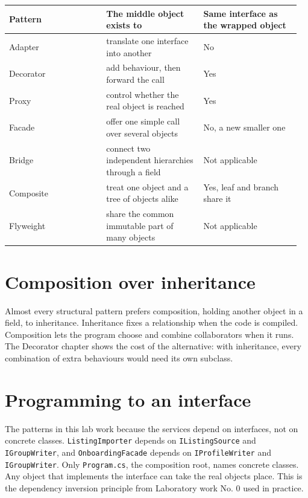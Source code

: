 \documentclass{utmreport}
\providecommand{\passthrough}[1]{#1}
\newcounter{none}
\begin{document}
{\def\LTcaptype{none} %
\begin{longtable}[]{@{}>{\raggedright\arraybackslash}p{0.320\linewidth}>{\raggedright\arraybackslash}p{0.320\linewidth}>{\raggedright\arraybackslash}p{0.320\linewidth}@{}}
\toprule\noalign{}
Pattern & The middle object exists to & Same interface as the wrapped object \\
\midrule\noalign{}
\endhead
\bottomrule\noalign{}
\endlastfoot
Adapter & translate one interface into another & No \\
Decorator & add behaviour, then forward the call & Yes \\
Proxy & control whether the real object is reached & Yes \\
Facade & offer one simple call over several objects & No, a new smaller one \\
Bridge & connect two independent hierarchies through a field & Not applicable \\
Composite & treat one object and a tree of objects alike & Yes, leaf and branch share it \\
Flyweight & share the common immutable part of many objects & Not applicable \\
\end{longtable}
}

\section{Composition over inheritance}

Almost every structural pattern prefers composition, holding another object in a field, to inheritance. Inheritance fixes a relationship when the code is compiled. Composition lets the program choose and combine collaborators when it runs. The Decorator chapter shows the cost of the alternative: with inheritance, every combination of extra behaviours would need its own subclass.

\section{Programming to an interface}

The patterns in this lab work because the services depend on interfaces, not on concrete classes. \passthrough{\lstinline!ListingImporter!} depends on \passthrough{\lstinline!IListingSource!} and \passthrough{\lstinline!IGroupWriter!}, and \passthrough{\lstinline!OnboardingFacade!} depends on \passthrough{\lstinline!IProfileWriter!} and \passthrough{\lstinline!IGroupWriter!}. Only \passthrough{\lstinline!Program.cs!}, the composition root, names concrete classes. Any object that implements the interface can take the real object\textquotesingle s place. This is the dependency inversion principle from Laboratory work No. 0 used in practice.
\end{document}
